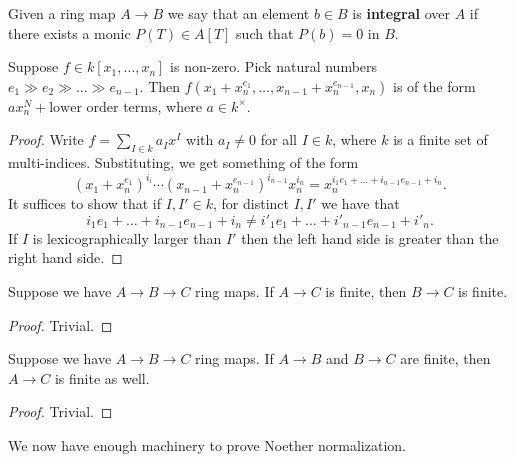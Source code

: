 \documentclass{../mathnotes}
\begin{document}
\begin{defn}
Given a ring map $A\to B$ we say that an element $b\in B$ is \textbf{integral} over $A$ if there exists a monic $P(T)\in A[T]$ such that $P(b)=0$ in $B$.
\end{defn}

\begin{lem}
\label{L2}
Suppose $f\in k[x_1,\ldots, x_n]$ is non-zero. Pick natural numbers $e_1\gg e_2\gg\ldots\gg e_{n-1}$. Then $f(x_1+x_n^{e_1},\ldots, x_{n-1}+x_n^{e_{n-1}}, x_n)$ is of the form $a x_n^N+\text{lower order terms}$, where $a\in k^\times$.
\end{lem}
\begin{proof}
Write $f=\sum_{I\in k}a_I x^I$ with $a_I\neq 0$ for all $I\in k$, where $k$ is a finite set of multi-indices. Substituting, we get something of the form
\[(x_1+x_n^{e_1})^{i_i}\cdots (x_{n-1}+x_n^{e_{n-1}})^{i_{n-1}}x_n^{i_n}=x_n^{i_1e_1+\ldots+i_{n-1}e_{n-1}+i_n}.\]
It suffices to show that if $I,I'\in k$, for distinct $I,I'$ we have that
\[i_1e_1+\ldots+i_{n-1}e_{n-1}+i_n\neq i'_1e_1+\ldots+ i'_{n-1}e_{n-1}+i'_n.\]
If $I$ is lexicographically larger than $I'$ then the left hand side is greater than the right hand side.
\end{proof}

\begin{lem}
\label{L3}
Suppose we have $A\to B\to C$ ring maps. If $A\to C$ is finite, then $B\to C$ is finite.
\end{lem}
\begin{proof}
Trivial.
\end{proof}

\begin{lem}
\label{L4}
Suppose we have $A\to B\to C$ ring maps. If $A\to B$ and $B\to C$ are finite, then $A\to C$ is finite as well.
\end{lem}
\begin{proof}
Trivial.
\end{proof}

We now have enough machinery to prove Noether normalization.
\end{document}
